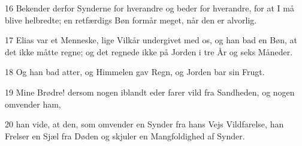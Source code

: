 \par 16 Bekender derfor Synderne for hverandre og beder for hverandre, for at I må blive helbredte; en retfærdigs Bøn formår meget, når den er alvorlig.
\par 17 Elias var et Menneske, lige Vilkår undergivet med os, og han bad en Bøn, at det ikke måtte regne; og det regnede ikke på Jorden i tre År og seks Måneder.
\par 18 Og han bad atter, og Himmelen gav Regn, og Jorden bar sin Frugt.
\par 19 Mine Brødre! dersom nogen iblandt eder farer vild fra Sandheden, og nogen omvender ham,
\par 20 han vide, at den, som omvender en Synder fra hans Vejs Vildfarelse, han Frelser en Sjæl fra Døden og skjuler en Mangfoldighed af Synder.


